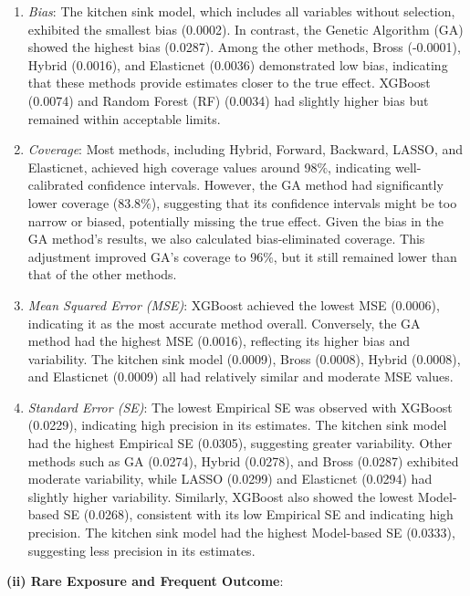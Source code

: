 \documentclass[sn-vancouver,Numbered,lineno,pdflatex]{sn-jnl}
\begin{document}
\begin{enumerate}
\def\labelenumi{\arabic{enumi}.}
\item
  \emph{Bias}: The kitchen sink model, which includes all variables
  without selection, exhibited the smallest bias (0.0002). In contrast,
  the Genetic Algorithm (GA) showed the highest bias (0.0287). Among the
  other methods, Bross (-0.0001), Hybrid (0.0016), and Elasticnet
  (0.0036) demonstrated low bias, indicating that these methods provide
  estimates closer to the true effect. XGBoost (0.0074) and Random
  Forest (RF) (0.0034) had slightly higher bias but remained within
  acceptable limits.
\item
  \emph{Coverage}: Most methods, including Hybrid, Forward, Backward,
  LASSO, and Elasticnet, achieved high coverage values around 98\(\%\),
  indicating well-calibrated confidence intervals. However, the GA
  method had significantly lower coverage (83.8\(\%\)), suggesting that
  its confidence intervals might be too narrow or biased, potentially
  missing the true effect. Given the bias in the GA method's results, we
  also calculated bias-eliminated coverage. This adjustment improved
  GA's coverage to 96\(\%\), but it still remained lower than that of
  the other methods.
\item
  \emph{Mean Squared Error (MSE)}: XGBoost achieved the lowest MSE
  (0.0006), indicating it as the most accurate method overall.
  Conversely, the GA method had the highest MSE (0.0016), reflecting its
  higher bias and variability. The kitchen sink model (0.0009), Bross
  (0.0008), Hybrid (0.0008), and Elasticnet (0.0009) all had relatively
  similar and moderate MSE values.
\item
  \emph{Standard Error (SE)}: The lowest Empirical SE was observed with
  XGBoost (0.0229), indicating high precision in its estimates. The
  kitchen sink model had the highest Empirical SE (0.0305), suggesting
  greater variability. Other methods such as GA (0.0274), Hybrid
  (0.0278), and Bross (0.0287) exhibited moderate variability, while
  LASSO (0.0299) and Elasticnet (0.0294) had slightly higher
  variability. Similarly, XGBoost also showed the lowest Model-based SE
  (0.0268), consistent with its low Empirical SE and indicating high
  precision. The kitchen sink model had the highest Model-based SE
  (0.0333), suggesting less precision in its estimates.
\end{enumerate}

\textbf{(ii) Rare Exposure and Frequent Outcome}:
\end{document}
